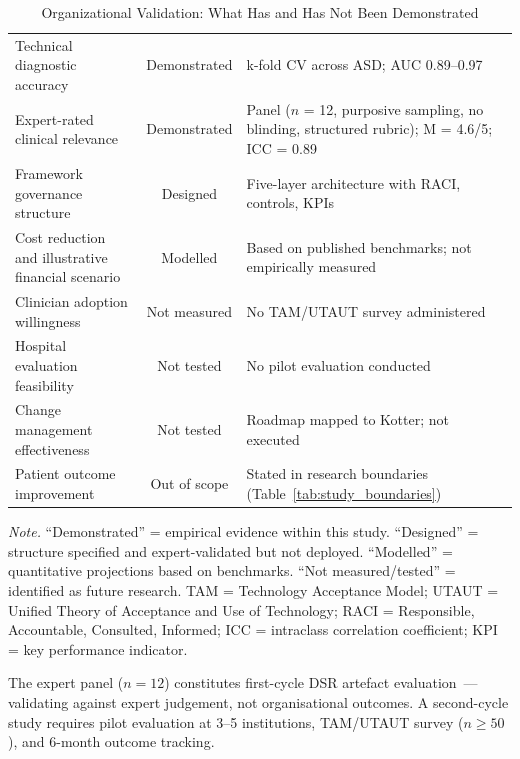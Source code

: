 \begin{table}[!htbp]
\tablestripes\tablefontsize
\caption[Organizational Validation Status]{Organizational Validation: What Has and Has Not Been Demonstrated}
\begin{tabularx}{\textwidth}{@{} L C L @{}}
\toprule
{} &  &  \\
\midrule
Technical diagnostic accuracy & Demonstrated & k-fold CV across ASD; AUC 0.89--0.97 \\
\addlinespace
Expert-rated clinical relevance & Demonstrated & Panel ($n$ = 12, purposive sampling, no blinding, structured rubric); M = 4.6/5; ICC = 0.89 \\
\addlinespace
Framework governance structure & Designed & Five-layer architecture with RACI, controls, KPIs \\
\addlinespace
Cost reduction and illustrative financial scenario & Modelled & Based on published benchmarks; not empirically measured \\
\addlinespace
Clinician adoption willingness & Not measured & No TAM/UTAUT survey administered \\
\addlinespace
Hospital evaluation feasibility & Not tested & No pilot evaluation conducted \\
\addlinespace
Change management effectiveness & Not tested & Roadmap mapped to Kotter; not executed \\
\addlinespace
Patient outcome improvement & Out of scope & Stated in research boundaries (Table~\ref{tab:study_boundaries}) \\
\bottomrule
\end{tabularx}
\vspace{0.5em}\noindent\textit{Note.} ``Demonstrated'' = empirical evidence within this study. ``Designed'' = structure specified and expert-validated but not deployed. ``Modelled'' = quantitative projections based on benchmarks. ``Not measured/tested'' = identified as future research. TAM = Technology Acceptance Model; UTAUT = Unified Theory of Acceptance and Use of Technology; RACI = Responsible, Accountable, Consulted, Informed; ICC = intraclass correlation coefficient; KPI = key performance indicator.
\end{table}

\noindent The expert panel ($n = 12$) constitutes first-cycle DSR artefact evaluation~\cite{hevner2004design}---validating against expert judgement, not organisational outcomes. A second-cycle study requires pilot evaluation at 3--5 institutions, TAM/UTAUT survey ($n \geq 50$), and 6-month outcome tracking.

